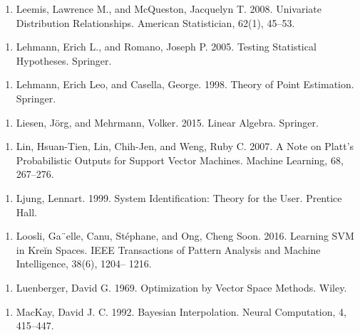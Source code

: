\begin{enumerate}
\item Leemis, Lawrence M., and McQueston, Jacquelyn T. 2008. Univariate Distribution Relationships. American Statistician, 62(1), 45–53.
\end{enumerate}

\begin{enumerate}
\item Lehmann, Erich L., and Romano, Joseph P. 2005. Testing Statistical Hypotheses. Springer.
\end{enumerate}

\begin{enumerate}
\item Lehmann, Erich Leo, and Casella, George. 1998. Theory of Point Estimation. Springer.
\end{enumerate}

\begin{enumerate}
\item Liesen, Jörg, and Mehrmann, Volker. 2015. Linear Algebra. Springer.
\end{enumerate}

\begin{enumerate}
\item Lin, Hsuan-Tien, Lin, Chih-Jen, and Weng, Ruby C. 2007. A Note on Platt’s Probabilistic Outputs for Support Vector Machines. Machine Learning, 68, 267–276.
\end{enumerate}

\begin{enumerate}
\item Ljung, Lennart. 1999. System Identiﬁcation: Theory for the User. Prentice Hall.
\end{enumerate}

\begin{enumerate}
\item Loosli, Ga¨elle, Canu, Stéphane, and Ong, Cheng Soon. 2016. Learning SVM in Kreĭn Spaces. IEEE Transactions of Pattern Analysis and Machine Intelligence, 38(6), 1204– 1216.
\end{enumerate}

\begin{enumerate}
\item Luenberger, David G. 1969. Optimization by Vector Space Methods. Wiley.
\end{enumerate}

\begin{enumerate}
\item MacKay, David J. C. 1992. Bayesian Interpolation. Neural Computation, 4, 415–447.
\end{enumerate}


